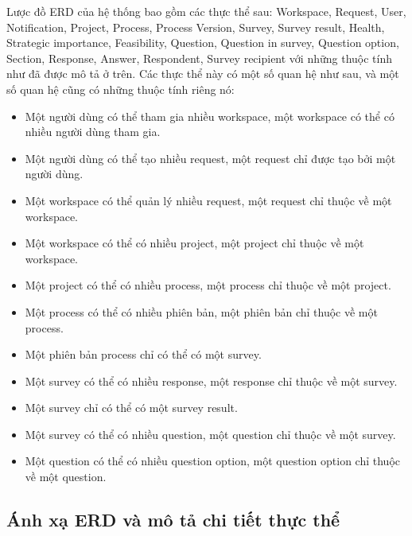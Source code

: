 \par
Lược đồ ERD của hệ thống bao gồm các thực thể sau: Workspace, Request,
User, Notification, Project, Process, Process Version, Survey, Survey result, Health, Strategic importance, Feasibility,
Question, Question in survey, Question option, Section, Response, Answer, Respondent, Survey recipient với những
thuộc tính như đã được mô tả ở trên. Các thực thể này có một số
quan hệ như sau, và một số quan hệ cũng có những thuộc tính riêng nó:
\begin{itemize}
    \item Một người dùng có thể tham gia nhiều workspace, một
    workspace có thể có nhiều người dùng tham gia.
    \item Một người dùng có thể tạo nhiều request, một request
    chỉ được tạo bởi một người dùng.
    \item Một workspace có thể quản lý nhiều request, một request
    chỉ thuộc về một workspace.
    \item Một workspace có thể có nhiều project, một project
    chỉ thuộc về một workspace.
    \item Một project có thể có nhiều process, một process
    chỉ thuộc về một project.
    \item Một process có thể có nhiều phiên bản, một phiên bản
    chỉ thuộc về một process.
    \item Một phiên bản process chỉ có thể có một survey.
    \item Một survey có thể có nhiều response, một response chỉ thuộc về một survey.
    \item Một survey chỉ có thể có một survey result.
    \item Một survey có thể có nhiều question, một question chỉ thuộc về một survey.
    \item Một question có thể có nhiều question option, một question option chỉ thuộc về một question.
\end{itemize}

\subsection{Ánh xạ ERD và mô tả chi tiết thực thể}

